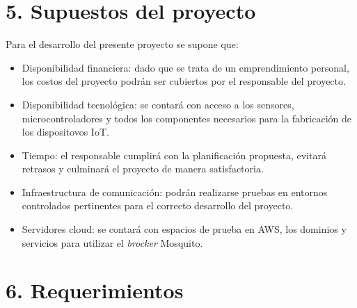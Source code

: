 \documentclass[
11pt, %
]{charter}
\begin{document}
\section{5. Supuestos del proyecto}
\label{sec:supuestos}

Para el desarrollo del presente proyecto se supone que:

\begin{itemize}
	\item Disponibilidad financiera: dado que se trata de un emprendimiento personal, los costos del proyecto podrán ser cubiertos por el responsable del proyecto.
	\item Disponibilidad tecnológica: se contará con acceso a los sensores, microcontroladores y todos los componentes necesarios para la fabricación de los dispositovos IoT.
	\item Tiempo: el responsable cumplirá con la planificación propuesta, evitará retrasos y culminará el proyecto de manera satisfactoria.
	\item Infraestructura de comunicación: podrán realizarse pruebas en entornos controlados pertinentes para el correcto desarrollo del proyecto.
	\item Servidores cloud: se contará con espacios de prueba en AWS, los dominios y servicios para utilizar el \textit{brocker} Mosquito.

\end{itemize}

\section{6. Requerimientos}
\label{sec:requerimientos}
\end{document}
